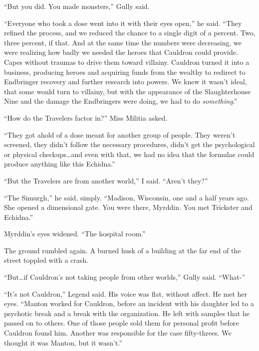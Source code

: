 ``But you did.  You made monsters,'' Gully said.



``Everyone who took a dose went into it with their eyes open,'' he said.  ``They refined the process, and we reduced the chance to a single digit of a percent.  Two, three percent, if that.  And at the same time the numbers were decreasing, we were realizing how badly we needed the heroes that Cauldron could provide.  Capes without traumas to drive them toward villainy.  Cauldron turned it into a business, producing heroes and acquiring funds from the wealthy to redirect to Endbringer recovery and further research into powers.  We knew it wasn't ideal, that some would turn to villainy, but with the appearance of the Slaughterhouse Nine and the damage the Endbringers were doing, we had to do \emph{something}.''



``How do the Travelers factor in?'' Miss Militia asked.



``They got ahold of a dose meant for another group of people.  They weren't screened, they didn't follow the necessary procedures, didn't get the psychological or physical checkups\ldots and even with that, we had no idea that the formulae could produce anything like this Echidna.''



``But the Travelers are from another world,'' I said.  ``Aren't they?''



``The Simurgh,'' he said, simply.  ``Madison, Wisconsin, one and a half years ago.  She opened a dimensional gate.  You were there, Myrddin.  You met Trickster and Echidna.''



Myrddin's eyes widened.  ``The hospital room.''



The ground rumbled again.  A burned husk of a building at the far end of the street toppled with a crash.



``But\ldots if Cauldron's not taking people from other worlds,'' Gully said.  ``What-''



``It's not Cauldron,'' Legend said.  His voice was flat, without affect.  He met her eyes.  ``Manton worked for Cauldron, before an incident with his daughter led to a psychotic break and a break with the organization.  He left with samples that he passed on to others.  One of those people sold them for personal profit before Cauldron found him.  Another was responsible for the case fifty-threes.  We thought it was Manton, but it wasn't.''




